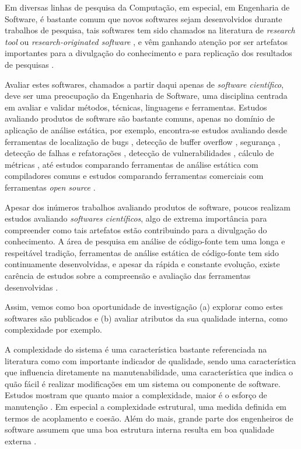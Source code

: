 
Em diversas linhas de pesquisa da Computação, em especial, em Engenharia de
Software, é bastante comum que novos softwares sejam desenvolvidos durante
trabalhos de pesquisa, tais softwares tem sido chamados na literatura de {\it
research tool} \cite{Portillo12} ou {\it research-originated software}
\cite{Kon2011}, e vêm ganhando atenção por ser artefatos importantes para a
divulgação do conhecimento e para replicação dos resultados de pesquisas
\cite{Stodden2009}.

Avaliar estes softwares, chamados a partir daqui apenas de {\it software
científico}, deve ser uma preocupação da Engenharia de Software, uma disciplina
centrada em avaliar e validar métodos, técnicas, linguagens e ferramentas.
Estudos avaliando produtos de software são bastante comuns, apenas no domínio
de aplicação de análise estática, por exemplo, encontra-se estudos
avaliando desde ferramentas de localização de bugs \cite{Rutar2004}, detecção
de buffer overflow \cite{Kratkiewicz2005}, segurança \cite{Okun2007,
Johns2011}, detecção de falhas e refatorações \cite{Wedyan2009}, detecção de
vulnerabilidades \cite{Li2010, Ataide2014}, cálculo de métricas
\cite{Alemerien2013}, até estudos comparando ferramentas de análise estática
com compiladores comuns \cite{Emanuelsson2008} e estudos comparando ferramentas
comerciais com ferramentas {\it open source} \cite{Al2010}.

Apesar dos inúmeros trabalhos avaliando produtos de software, poucos realizam
estudos avaliando {\it softwares científicos}, algo de extrema importância para
compreender como tais artefatos estão contribuindo para a divulgação do
conhecimento. A área de pesquisa em análise de código-fonte tem uma longa e
respeitável tradição, ferramentas de análise estática de código-fonte tem sido
continuamente desenvolvidas, e apesar da rápida e constante evolução, existe
carência de estudos sobre a compreensão e avaliação das ferramentas
desenvolvidas \cite{Li2010}.

Assim, vemos como boa oportunidade de investigação (a) explorar como estes
softwares são publicados e (b) avaliar atributos da sua qualidade interna,
como complexidade por exemplo.

A complexidade do
sistema é uma característica bastante referenciada na literatura como com
importante indicador de qualidade, sendo uma característica que influencia diretamente na
manutenabilidade, uma característica que indica o quão fácil é realizar
modificações em um sistema ou componente de software. Estudos mostram que
quanto maior a complexidade, maior é o esforço de manutenção
\cite{hashim1996software, Darcy2005}. Em especial a complexidade estrutural,
uma medida definida em termos de acoplamento e coesão. Além do mais, grande
parte dos engenheiros de software assumem que uma boa estrutura interna resulta
em boa qualidade externa \cite{Fenton2014}.


